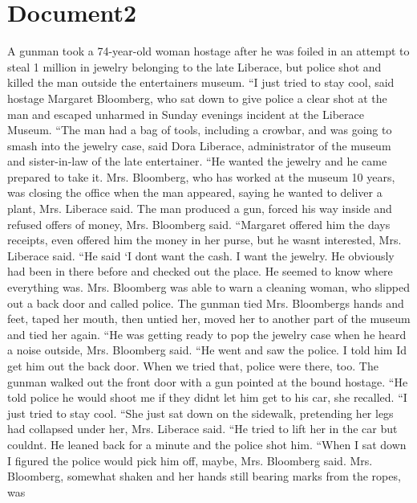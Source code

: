 \documentclass{article}
\begin{document}
\color[rgb]{0,0,0}\section{Document2}
\color[rgb]{0.29411764705882354,0.3686274509803922,0.5058823529411764}A gunman took a 74-year-old woman hostage after he was foiled in an attempt to steal 1 million in jewelry belonging to the late Liberace, but police shot and killed the man outside the entertainers museum. ``I just tried to stay cool, said hostage Margaret Bloomberg, who sat down to give police a clear shot at the man and escaped unharmed in Sunday evenings incident at the Liberace Museum. ``The man had a bag of tools, including a crowbar, and was going to smash into the jewelry case, said Dora Liberace, administrator of the \color[rgb]{0.9372549019607843,0.48627450980392156,0.396078431372549}museum and sister-in-law of the \color[rgb]{0.29411764705882354,0.3686274509803922,0.5058823529411764}late \color[rgb]{0.9372549019607843,0.48627450980392156,0.396078431372549}entertainer. ``He \color[rgb]{0.29411764705882354,0.3686274509803922,0.5058823529411764}wanted the jewelry and he came prepared to take it. Mrs. Bloomberg, who has worked at the museum 10 years, was closing the office when the man appeared, saying he wanted to deliver a \color[rgb]{0.40784313725490196,0.20784313725490197,0.03529411764705882}plant, \color[rgb]{0.29411764705882354,0.3686274509803922,0.5058823529411764}Mrs. Liberace said. The man produced a gun, forced his way inside and refused offers of money, Mrs. Bloomberg said. ``Margaret offered him the days receipts, even offered him the money in her purse, but he wasnt interested, Mrs. Liberace said. ``He said `I dont want the cash. I want the jewelry. He obviously had been in there before and checked out the place. He seemed to know where everything was. Mrs. Bloomberg was able to warn a cleaning woman, who slipped out a back door and called police. The gunman tied Mrs. Bloombergs hands and feet, \color[rgb]{0.9137254901960784,0.34509803921568627,0.1568627450980392}taped \color[rgb]{0.29411764705882354,0.3686274509803922,0.5058823529411764}her mouth, then untied her, moved her to another part of the museum and tied her again. ``He was getting ready to pop the jewelry case when he heard a noise outside, Mrs. Bloomberg said. ``He went and saw the police. I told him Id get him out the back door. When we tried that, police were there, too. The gunman walked out the front door with a gun pointed at the bound hostage. ``He told police he would shoot me if they didnt let him get to his car, she recalled. ``I just tried to stay cool. ``She just sat down on the sidewalk, pretending her legs had collapsed under her, Mrs. Liberace said. ``He tried to lift her in the car but couldnt. He leaned back for a minute and the police shot him. ``When I sat down I figured the police would pick him off, maybe, Mrs. Bloomberg said. Mrs. Bloomberg, \color[rgb]{0.9372549019607843,0.48627450980392156,0.396078431372549}somewhat \color[rgb]{0.29411764705882354,0.3686274509803922,0.5058823529411764}shaken and her hands still bearing \color[rgb]{0.9372549019607843,0.48627450980392156,0.396078431372549}marks from the ropes, was 
\end{document}
